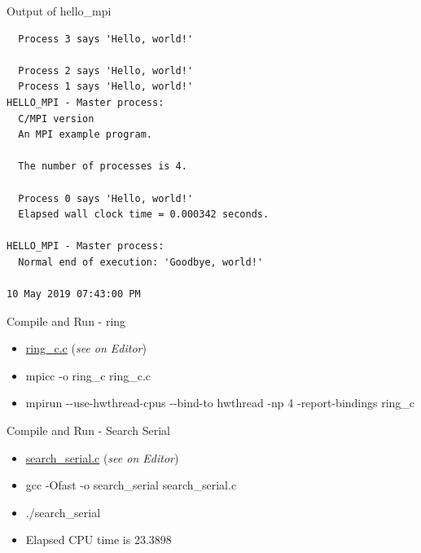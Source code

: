 \documentclass[ignorenonframetext,]{beamer}
\providecommand{\tightlist}{%
  \setlength{\itemsep}{0pt}\setlength{\parskip}{0pt}}
\begin{document}
\begin{frame}[fragile]{Output of hello\_mpi}

\begin{verbatim}
  Process 3 says 'Hello, world!'

  Process 2 says 'Hello, world!'
  Process 1 says 'Hello, world!'
HELLO_MPI - Master process:
  C/MPI version
  An MPI example program.

  The number of processes is 4.

  Process 0 says 'Hello, world!'
  Elapsed wall clock time = 0.000342 seconds.

HELLO_MPI - Master process:
  Normal end of execution: 'Goodbye, world!'

10 May 2019 07:43:00 PM
\end{verbatim}

\end{frame}

\begin{frame}{Compile and Run - ring}

\begin{itemize}
\item
  \url{ring_c.c} (\emph{see on Editor})
\item
  mpicc -o ring\_c ring\_c.c
\item
  mpirun -\/-use-hwthread-cpus -\/-bind-to hwthread -np 4
  -report-bindings ring\_c
\end{itemize}


\end{frame}

\begin{frame}{Compile and Run - Search Serial}

\begin{itemize}
\tightlist
\item
  \url{search_serial.c} (\emph{see on Editor})
\item
  gcc -Ofast -o search\_serial search\_serial.c
\item
  ./search\_serial
\end{itemize}


\begin{itemize}
\tightlist
\item
  Elapsed CPU time is 23.3898
\end{itemize}


\end{frame}
\end{document}
